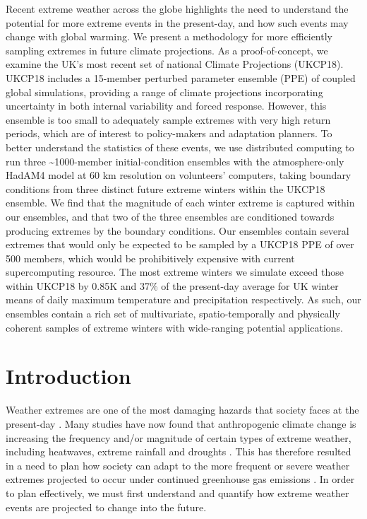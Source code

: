   Recent extreme weather across the globe highlights the need to understand the potential for more extreme events in the present-day, and how such events may change with global warming. We present a methodology for more efficiently sampling extremes in future climate projections. As a proof-of-concept, we examine the UK's most recent set of national Climate Projections (UKCP18). UKCP18 includes a 15-member perturbed parameter ensemble (PPE) of coupled global simulations, providing a range of climate projections incorporating uncertainty in both internal variability and forced response. However, this ensemble is too small to adequately sample extremes with very high return periods, which are of interest to policy-makers and adaptation planners. To better understand the statistics of these events, we use distributed computing to run three \textasciitilde1000-member initial-condition ensembles with the atmosphere-only HadAM4 model at 60 km resolution on volunteers' computers, taking boundary conditions from three distinct future extreme winters within the UKCP18 ensemble. We find that the magnitude of each winter extreme is captured within our ensembles, and that two of the three ensembles are conditioned towards producing extremes by the boundary conditions. Our ensembles contain several extremes that would only be expected to be sampled by a UKCP18 PPE of over 500 members, which would be prohibitively expensive with current supercomputing resource. The most extreme winters we simulate exceed those within UKCP18 by 0.85K and 37\% of the present-day average for UK winter means of daily maximum temperature and precipitation respectively. As such, our ensembles contain a rich set of multivariate, spatio-temporally and physically coherent samples of extreme winters with wide-ranging potential applications.

\section{Introduction}\label{ch5:intro}

  Weather extremes are one of the most damaging hazards that society faces at the present-day \citep{wef_global_2021}. Many studies have now found that anthropogenic climate change is increasing the frequency and/or magnitude of certain types of extreme weather, including heatwaves, extreme rainfall and droughts \citep{masson-delmotte_weather_2021}. This has therefore resulted in a need to plan how society can adapt to the more frequent or severe weather extremes projected to occur under continued greenhouse gas emissions \citep{allen_warming_2009,diffenbaugh_quantifying_2017,rahmstorf_increase_2011}. In order to plan effectively, we must first understand and quantify how extreme weather events are projected to change into the future.

